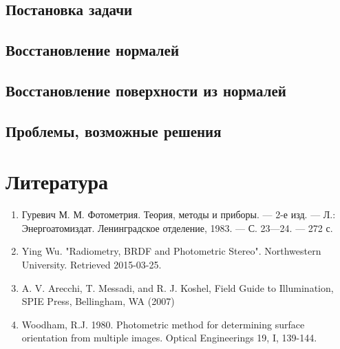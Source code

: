 \documentclass[12pt]{article}
\begin{document}
\subsection{Постановка задачи}



\subsection{Восстановление нормалей}
\subsection{Восстановление поверхности из нормалей}
\subsection{Проблемы, возможные решения}

\section{Литература}
\begin{enumerate}
  \item Гуревич М. М. Фотометрия. Теория, методы и приборы. — 2-е изд. — Л.: Энергоатомиздат. Ленинградское отделение, 1983. — С. 23—24. — 272 с.
  \item Ying Wu. "Radiometry, BRDF and Photometric Stereo". Northwestern University. Retrieved 2015-03-25.
  \item A. V. Arecchi, T. Messadi, and R. J. Koshel, Field Guide to Illumination, SPIE Press, Bellingham, WA (2007)
  \item Woodham, R.J. 1980. Photometric method for determining surface orientation from multiple images. Optical Engineerings 19, I, 139-144.
\end{enumerate}
\end{document}
